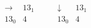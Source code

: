 $$
\begin{array}{r|*{1}{r}}
\rightarrow  &     13_{  1}\\
\hline
    13_{  0} &            4\\
\end{array}
\qquad
\begin{array}{r|*{1}{r}}
\downarrow  &     13_{  1}\\
\hline
    13_{  0} &            4\\
\end{array}
$$
